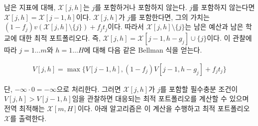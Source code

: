 \documentclass[11pt]{article} %
\newif\ifen
\theoremstyle{definition}
\theoremstyle{definition}
\begin{document}
\ifen
For the remaining indices, $\mathcal{X}[j, h]$ either contains $j$ or not. If it does not contain $j$, then $\mathcal{X}[j, h] = \mathcal{X}[j-1, h]$. On the other hand, if  $\mathcal{X}[j, h]$ contains $j$, then its valuation is $(1 - f_j) v(\mathcal{X}[j, h]\setminus \{j\}) + f_j t_j$. This requires that $\mathcal{X}[j, h]\setminus \{j\}$ make optimal use of the remaining budget over the remaining schools; that is, $\mathcal{X}[j, h] = \mathcal{X}[j-1, h - g_j] \cup\{j\}$. From these observations, we obtain the following Bellman equation for $ j = 1\dots m$ and $h = 1\dots H$:
\else
남은 지표에 대해, $\mathcal{X}[j, h]$는 $j$를 포함하거나 포함하지 않는다. $j$를 포함하지 않는다면 $\mathcal{X}[j, h] = \mathcal{X}[j-1, h]$이다. $\mathcal{X}[j, h]$가 $j$를 포함한다면, 그의 가치는  $(1 - f_j) v(\mathcal{X}[j, h]\setminus \{j\}) + f_j t_j$이다. 따라서 $\mathcal{X}[j, h]\setminus \{j\}$는 남은 예산과 남은 학교에 대한 최적 포트폴리오다. 즉,  $\mathcal{X}[j, h] = \mathcal{X}[j-1, h - g_j] \cup\{j\}$이다. 이 관찰에 따라 $ j = 1\dots m$와 $h = 1\dots H$에 대해 다음 같은 Bellman 식을 얻는다.
\fi
\begin{align}
V[j, h] = \max\bigl\{ V[j-1, h], (1 - f_j) V[j-1, h-g_j] + f_j t_j \bigr\}
\end{align}
\ifen 
with the convention that $ -\infty \cdot 0 = -\infty$. The corresponding optimal portfolios are computed by observing that $\mathcal{X}[j, h]$ contains $j$ if and only if $V[j, h]> V[j-1, h]$. The optimal solution is given by $\mathcal{X}[m, H]$. The algorithm below performs these computations and outputs the optimal portfolio $\mathcal{X}$. 
\else
단, $ -\infty \cdot 0 = -\infty$으로 처리한다. 그러면 $\mathcal{X}[j, h]$가  $j$를 포함할 필수충분 조건이 $V[j, h]> V[j-1, h]$임을 관찰하면 대응되는 최적 포트폴리오를 계산할 수 있으며 전역 최적해는 $\mathcal{X}[m, H]$이다. 아래 알고리즘은 이 계산을 수행하고 최적 포트폴리오 $\mathcal{X}$를 출력한다.
\fi
\end{document}
